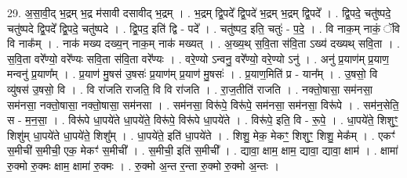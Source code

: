 \documentclass[17pt]{extarticle}
\begin{document}
29. अ॒सा॒वी॒द् भ॒द्रम् भ॒द्र म॑सावी दसावीद् भ॒द्रम् । . भ॒द्रम् द्वि॒पदे᳚ द्वि॒पदे॑ भ॒द्रम् भ॒द्रम् द्वि॒पदे᳚ । . द्वि॒पदे॒ चतु॑ष्पदे॒ चतु॑ष्पदे द्वि॒पदे᳚ द्वि॒पदे॒ चतु॑ष्पदे । . द्वि॒पद॒ इति॑ द्वि - पदे᳚ । . चतु॑ष्पद॒ इति॒ चतुः॑ - प॒दे॒ । . वि नाक॒म् नाकं॒ ॅवि वि नाक᳚म् । . नाक॑ मख्य दख्य॒न् नाक॒म् नाक॑ मख्यत् । . अ॒ख्य॒थ् स॒वि॒ता स॑वि॒ता ऽख्य॑ दख्यथ् सवि॒ता । . स॒वि॒ता वरे᳚ण्यो॒ वरे᳚ण्यः सवि॒ता स॑वि॒ता वरे᳚ण्यः । . वरे॒ण्यो ऽन्वनु॒ वरे᳚ण्यो॒ वरे॒ण्यो ऽनु॑ । . अनु॑ प्र॒याण॑म् प्र॒याण॒ मन्वनु॑ प्र॒याण᳚म् । . प्र॒याण॑ मु॒षस॑ उ॒षसः॑ प्र॒याण॑म् प्र॒याण॑ मु॒षसः॑ । . प्र॒याण॒मिति॑ प्र - यान᳚म् । . उ॒षसो॒ वि व्यु॑षस॑ उ॒षसो॒ वि । . वि रा॑जति राजति॒ वि वि रा॑जति । . रा॒ज॒तीति॑ राजति । . नक्तो॒षासा॒ सम॑नसा॒ सम॑नसा॒ नक्तो॒षासा॒ नक्तो॒षासा॒ सम॑नसा । . सम॑नसा॒ विरू॑पे॒ विरू॑पे॒ सम॑नसा॒ सम॑नसा॒ विरू॑पे । . सम॑न॒सेति॒ स - म॒न॒सा॒ । . विरू॑पे धा॒पये॑ते धा॒पये॑ते॒ विरू॑पे॒ विरू॑पे धा॒पये॑ते । . विरू॑पे॒ इति॒ वि - रू॒पे॒ । . धा॒पये॑ते॒ शिशुꣳ॒॒ शिशु॑म् धा॒पये॑ते धा॒पये॑ते॒ शिशु᳚म् । . धा॒पये॑ते॒ इति॑ धा॒पये॑ते । . शिशु॒ मेक॒ मेकꣳ॒॒ शिशुꣳ॒॒ शिशु॒ मेक᳚म् । . एकꣳ॑ स॒मीची॑ स॒मीची॒ एक॒ मेकꣳ॑ स॒मीची᳚ । . स॒मीची॒ इति॑ स॒मीची᳚ । . द्यावा॒ क्षाम॒ क्षाम॒ द्यावा॒ द्यावा॒ क्षाम॑ । . क्षामा॑ रु॒क्मो रु॒क्मः क्षाम॒ क्षामा॑ रु॒क्मः । . रु॒क्मो अ॒न्त र॒न्ता रु॒क्मो रु॒क्मो अ॒न्तः । \newline
\end{document}
